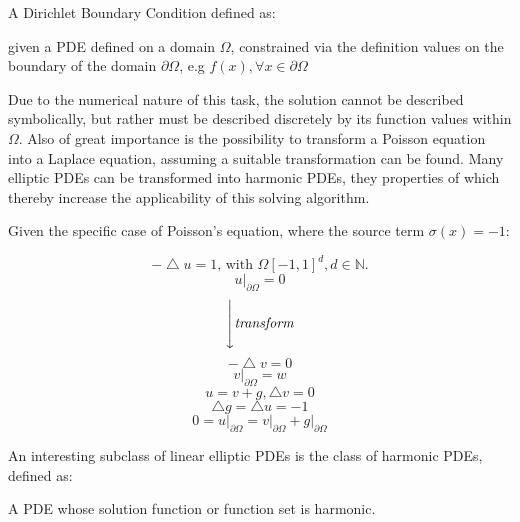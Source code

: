 A Dirichlet Boundary Condition defined as:
\begin{definition}
given a \Gls{PDE}
defined on a domain $\Omega$, constrained via the definition values on the
 boundary of the domain $\partial \Omega$, e.g $f(x), \forall  x \in \partial \Omega$
\end{definition}
Due to the numerical nature of this task, the solution cannot be described symbolically,
but rather must be described discretely by its function values within $\Omega$.
Also of great importance is the possibility to transform a Poisson equation into
a Laplace equation, assuming a suitable transformation can be found.   Many elliptic \glspl{PDE} can be transformed into harmonic \glspl{PDE},
they properties of which thereby increase the applicability of this solving algorithm\cite{Bornemann}.
\begin{example}
  Given the specific case of Poisson's equation, where the source term $\sigma(x)=-1$:
  \begin{multicols}{2}
    \begin{equation}
      -\bigtriangleup u = 1\text{, with }\Omega [-1,1]^{d}, d \in \mathbb{N}.
    \end{equation}
      $$u\big\rvert_{\partial \Omega} = 0 $$
    \begin{equation}
      \Bigg\downarrow \textit{transform}
    \end{equation}
    \begin{equation}
      -\bigtriangleup v = 0
    \end{equation}
    $$v\big\rvert_{\partial \Omega} = w$$
    \break
    \begin{equation}
    u = v + g, \bigtriangleup v = 0
    \end{equation}
    \begin{equation}
      \bigtriangleup g = \bigtriangleup u = -1
    \end{equation}
        $$0 = u\big\rvert_{\partial \Omega} = v\big\rvert_{\partial \Omega} + g\big\rvert_{\partial \Omega}$$\break\break
  \end{multicols}
\cite{Bornemann}
\end{example}
An interesting subclass of linear elliptic \Glspl{PDE} is the class of harmonic \Glspl{PDE}, defined as:
\begin{definition}
  A \Gls{PDE} whose solution function or function set is harmonic.
\end{definition}

